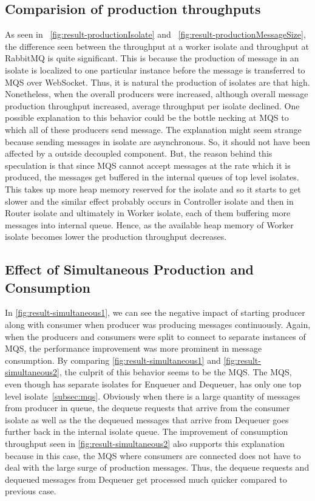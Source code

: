 \subsection{Comparision of production throughputs}
  As seen in ~\autoref{fig:result-productionIsolate} and ~\autoref{fig:result-productionMessageSize}, the difference seen between the throughput at a worker isolate and throughput at RabbitMQ is quite significant. This is because the production of message in an isolate is localized to one particular instance before the message is transferred to MQS over WebSocket. Thus, it is natural the production of isolates are that high. Nonetheless, when the overall producers were increased, although overall message production throughput increased, average throughput per isolate declined. One possible explanation to this behavior could be the bottle necking at MQS to which all of these producers send message. The explanation might seem strange because sending messages in isolate are asynchronous. So, it should not have been affected by a outside decoupled component. But, the reason behind this speculation is that since MQS cannot accept messages at the rate which it is produced, the messages get buffered in the internal queues of top level isolates. This takes up more heap memory reserved for the isolate and so it starts to get slower and the similar effect probably occurs in Controller isolate and then in Router isolate and ultimately in Worker isolate, each of them buffering more messages into internal queue. Hence, as the available heap memory of Worker isolate becomes lower the production throughput decreases.

\subsection{Effect of Simultaneous Production and Consumption}
In \autoref{fig:result-simultaneous1}, we can see the negative impact of starting producer along with consumer when producer was producing messages continuously. Again, when the producers and consumers were split to connect to separate instances of MQS, the performance improvement was more prominent in message consumption.
  By comparing \autoref{fig:result-simultaneous1} and \autoref{fig:result-simultaneous2}, the culprit of this behavior seems to be the MQS. The MQS, even though has separate isolates for Enqueuer and Dequeuer, has only one top level isolate~\autoref{subsec:mqs}. Obviously when there is a large quantity of messages from producer in queue, the dequeue requests that arrive from the consumer isolate as well as the the dequeued messages that arrive from Dequeuer goes further back in the internal isolate queue. The improvement of consumption throughput seen in
   \autoref{fig:result-simultaneous2} also supports this explanation because in this case, the MQS where consumers are connected does not have to deal with the large surge of production messages. Thus, the dequeue requests and dequeued messages from Dequeuer get processed much quicker compared to previous case.


